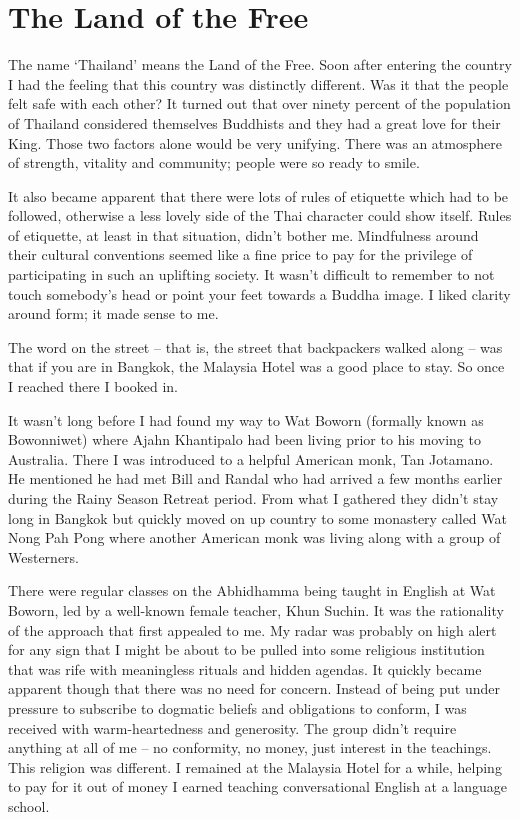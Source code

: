 \chapter{The Land of the Free}

The name `Thailand' means the Land of the Free\cite{free}.
Soon after entering the country I had the feeling
that this country was distinctly different. Was it that the people felt
safe with each other? It turned out that over ninety percent of the
population of Thailand considered themselves Buddhists and they had a
great love for their King. Those two factors alone would be very unifying.
There was an atmosphere of strength, vitality and community; people were
so ready to smile.

It also became apparent that there were lots of rules of etiquette which
had to be followed, otherwise a less lovely side of the Thai character
could show itself. Rules of etiquette, at least in that situation,
didn't bother me. Mindfulness around their cultural conventions seemed
like a fine price to pay for the privilege of participating in such an
uplifting society. It wasn't difficult to remember to not touch
somebody's head or point your feet towards a Buddha image. I liked
clarity around form; it made sense to me.

The word on the street -- that is, the street that backpackers walked
along -- was that if you are in Bangkok, the Malaysia Hotel was a good
place to stay. So once I reached there I booked in.

It wasn't long before I had found my way to Wat Boworn (formally known as
Bowonniwet) where Ajahn Khantipalo had been living prior to
his moving to Australia. There I was introduced to a helpful American
monk, Tan Jotamano. He mentioned he had met Bill and Randal who had
arrived a few months earlier during the Rainy Season Retreat period.
From what I gathered they didn't stay long in Bangkok but quickly moved
on up country to some monastery called Wat Nong Pah Pong where another
American monk was living along with a group of Westerners.

There were regular classes on the Abhidhamma being taught in English at
Wat Boworn, led by a well-known female teacher, Khun Suchin. It was the
rationality of the approach that first appealed to me. My radar was
probably on high alert for any sign that I might be about to be pulled
into some religious institution that was rife with meaningless rituals
and hidden agendas. It quickly became apparent though that there was no
need for concern. Instead of being put under pressure to subscribe to
dogmatic beliefs and obligations to conform, I was received with
warm-heartedness and generosity. The group didn't require anything at
all of me -- no conformity, no money, just interest in the teachings.
This religion was different. I remained at the Malaysia Hotel for a
while, helping to pay for it out of money I earned teaching
conversational English at a language school.

